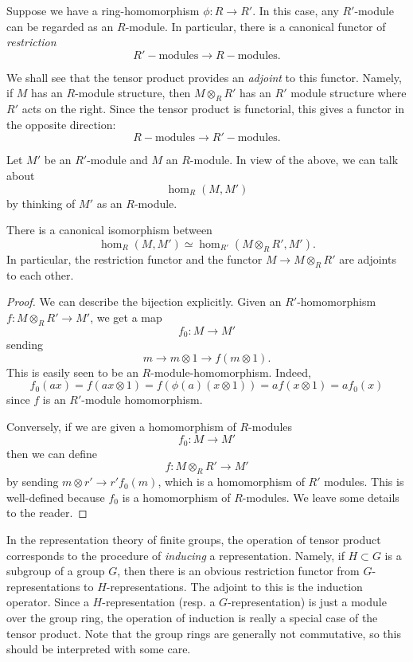 Suppose we have a
ring-homomorphism $\phi:R \to R'$.  In this case, any $R'$-module can be regarded as
an $R$-module. 
In particular, there is a canonical functor of \emph{restriction}
\[ R'-\mathrm{modules} \to R-\mathrm{modules}.  \]

We shall see that the tensor product provides an \emph{adjoint} to this functor. 
Namely, if $M$ has an $R$-module
structure, then $M \otimes_R R'$ has an $R'$ module structure where $R'$ acts
on the right. Since the tensor product is functorial, this gives a functor in the opposite direction:
\[ R-\mathrm{modules} \to R'-\mathrm{modules}.  \]


Let $M'$ be an $R'$-module and $M$ an $R$-module. In view of the above, we can talk about 
\[ \hom_R(M, M')  \]
by thinking of $M'$ as an $R$-module.

\begin{proposition} 
There is a canonical isomorphism between
\[ \hom_R(M, M') \simeq \hom_{R'}(M \otimes_R R', M').  \]
In particular, the restriction functor and the functor $M \to M \otimes_R R'$
are adjoints to each other.
\end{proposition} 


\begin{proof} 
We can describe the bijection explicitly. Given an $R'$-homomorphism $f:M
\otimes_R R' \to M'$, we get a map 
\[ f_0:M \to M'  \]
sending
\[ m \to m \otimes 1 \to f(m \otimes 1).  \]
This is easily seen to be an $R$-module-homomorphism. Indeed, 
\[ f_0(ax) = f(ax \otimes 1) = f(\phi(a)(x \otimes 1)) = a f(x \otimes 1)  =
a f_0(x)  \]
since $f$ is an $R'$-module homomorphism.

Conversely, if we are given a homomorphism of $R$-modules
\[ f_0: M \to M'  \]
then we can define
\[ f: M \otimes_R R' \to M'  \]
by sending $m \otimes r' \to r' f_0(m)$, which is a homomorphism of $R'$ modules. 
This is well-defined because $f_0$ is  a homomorphism of $R$-modules. We leave
some details to the reader.
\end{proof} 

\begin{example} 
In the representation theory of finite groups, the operation of tensor product
corresponds to the procedure of \emph{inducing} a representation. Namely, if
$H \subset G$ is a subgroup of a group $G$, then there is an obvious
restriction functor from $G$-representations to $H$-representations. 
The adjoint to this is the induction operator. Since a $H$-representation
(resp. a $G$-representation) is just a module over the group ring, the
operation of induction is really a special case of the tensor product. Note
that the group rings are generally not commutative, so this should be
interpreted with some care. 
\end{example} 

